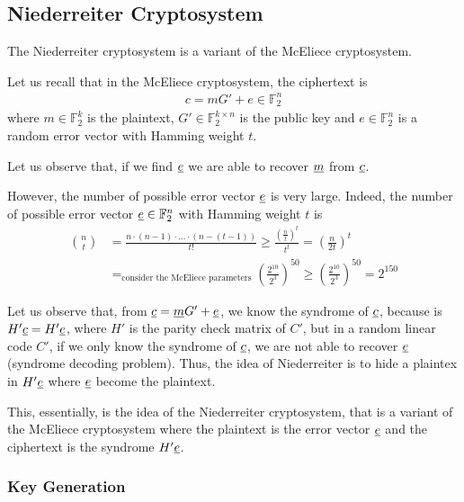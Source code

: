 \subsection{Niederreiter Cryptosystem}
The Niederreiter cryptosystem is a variant of the McEliece cryptosystem.
\bigskip

\noindent
Let us recall that in the McEliece cryptosystem, the ciphertext is
\begin{align*}
    c = mG' + e \in \mathbb{F}_2^n
\end{align*}
\noindent
where $m \in \mathbb{F}_2^k$ is the plaintext, $G' \in \mathbb{F}_2^{k \times n}$ is the public key and $e \in \mathbb{F}_2^n$ is a random error vector with Hamming weight $t$.
\medskip

\noindent
Let us observe that, if we find $\underline{e}$ we are able to recover $\underline{m}$ from $\underline{c}$.
\medskip

\noindent
However, the number of possible error vector $\underline{e}$ is very large. Indeed, the number of possible error vector $\underline{e} \in \mathbb{F}_2^n$ with Hamming weight $t$ is
\begin{align*}
    \binom{n}{t} &= \frac{n \cdot (n-1) \cdot \ldots \cdot (n-(t-1))}{t!} \geq \frac{(\frac{n}{t})^t}{t^t} = \left(\frac{n}{2t}\right)^t \\
    &=_{\text{consider the McEliece parameters}} \left(\frac{2^{10}}{2^3}\right)^{50} \geq \left(\frac{2^{10}}{2^3}\right)^{50} = 2^{150}
\end{align*}

\noindent
Let us observe that, from $\underline{c} = \underline{m}G' + \underline{e}$, we know the syndrome of $\underline{c}$, because is $H'\underline{c} = H'\underline{e}$, where $H'$ is the parity check matrix of $C'$, but in a random linear code $C'$, if we only know the syndrome of $\underline{c}$, we are not able to recover $\underline{e}$ (syndrome decoding problem).
\medskip
\noindent
Thus, the idea of Niederreiter is to hide a plaintex in $H'\underline{e}$ where $\underline{e}$ become the plaintext.
\bigskip

\noindent
This, essentially, is the idea of the Niederreiter cryptosystem, that is a variant of the McEliece cryptosystem where the plaintext is the error vector $\underline{e}$ and the ciphertext is the syndrome $H'\underline{e}$.

\subsubsection{Key Generation}


